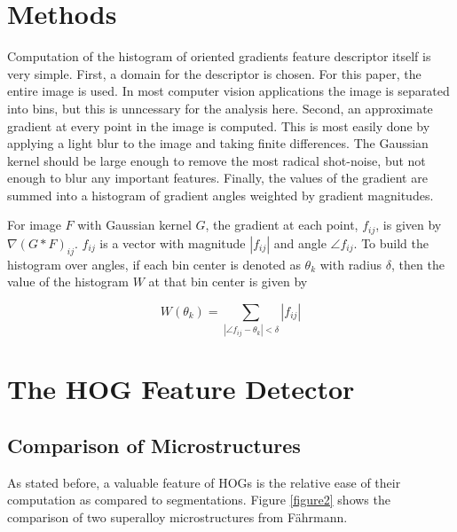 \documentclass[review]{elsarticle}
\begin{document}

	\section{Methods}\label{methodsandmaterials}
		Computation of the histogram of oriented gradients feature descriptor itself is very simple. First, a domain for the descriptor is chosen. For this paper, the entire image is used. In most computer vision applications the image is separated into bins, but this is unncessary for the analysis here. Second, an approximate gradient at every point in the image is computed. This is most easily done by applying a light blur to the image and taking finite differences. The Gaussian kernel should be large enough to remove the most radical shot-noise, but not enough to blur any important features. Finally, the values of the gradient are summed into a histogram of gradient angles weighted by gradient magnitudes.

		For image $F$ with Gaussian kernel $G$, the gradient at each point, $f_{ij}$, is given by $\nabla \left( G \ast F \right)_{ij}$. $f_{ij}$ is a vector with magnitude $\left| f_{ij} \right|$ and angle $\angle f_{ij}$. To build the histogram over angles, if each bin center is denoted as $\theta_k$ with radius $\delta$, then the value of the histogram $W$ at that bin center is given by

		\begin{equation}
			W \left( \theta_k \right) = \sum_{\left| \angle f_{ij} - \theta_k \right| < \delta} \left| f_{ij} \right|
		\end{equation}

	\section{The HOG Feature Detector}\label{hog}
	\subsection{Comparison of Microstructures}
	As stated before, a valuable feature of HOGs is the relative ease of their computation as compared to segmentations. Figure \ref{figure2} shows the comparison of two superalloy microstructures from F\"ahrmann\cite{faehrmann}.
\end{document}
